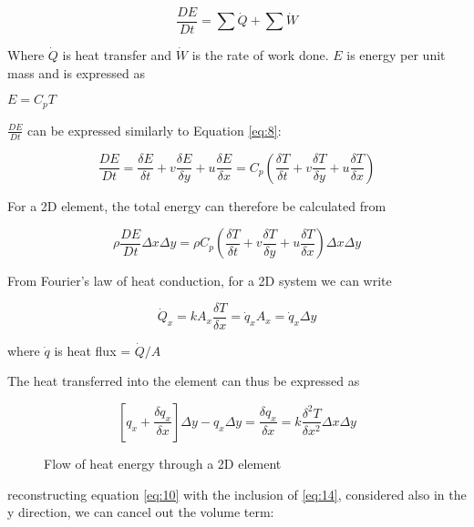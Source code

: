     \begin{equation} \label{eq:10}
      \frac{DE}{Dt} = \sum{\dot{Q}} + \sum{\dot{W}}
    \end{equation}

    Where $\dot{Q}$ is heat transfer and $\dot{W}$ is the rate of work done. $E$ is energy per unit mass and is expressed as

    \centerline{$E = C_{p} T$}

    $\frac{DE}{Dt}$ can be expressed similarly to Equation \ref{eq:8}:

    \begin{equation} \label{eq:11}
      \frac{DE}{Dt} = \frac{\delta E}{\delta t} + v \frac{\delta E}{\delta y} + u \frac{\delta E}{\delta x} = C_{p} (\frac{\delta T}{\delta t} + v \frac{\delta T}{\delta y} + u \frac{\delta T}{\delta x})
    \end{equation}

    For a 2D element, the total energy can therefore be calculated from

    \begin{equation} \label{eq:12}
      \rho \frac{DE}{Dt} \Delta x \Delta y = \rho   C_{p} (\frac{\delta T}{\delta t} + v \frac{\delta T}{\delta y} + u \frac{\delta T}{\delta x}) \Delta x \Delta y
    \end{equation}

    From Fourier's law of heat conduction, for a 2D system we can write

    \begin{equation} \label{eq:13}
      \dot{Q}_{x} = k A_{x} \frac{\delta T}{\delta x} = \dot{q}_{x} A_{x} = \dot{q}_{x} \Delta y
    \end{equation}

    where $\dot{q}$ is heat flux = $\dot{Q}/A$

    The heat transferred into the element can thus be expressed as

    \begin{equation} \label{eq:14}
      [q_{x} + \frac{\delta q_{x}}{\delta x}] \Delta y - q_{x} \Delta y = \frac{\delta q_{x}}{\delta x} = k \frac{\delta^2 T}{\delta x^2} \Delta x \Delta y
    \end{equation}

    \begin{figure} \label{fig:eneq}
      \caption{Flow of heat energy through a 2D element}
    \end{figure}

    reconstructing equation \ref{eq:10} with the inclusion of \ref{eq:14}, considered also in the y direction, we can cancel out the volume term:

